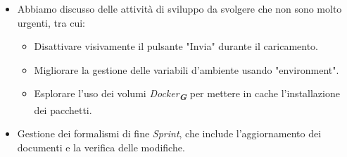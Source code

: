 \begin{itemize}
    \item Abbiamo discusso delle attività di sviluppo da svolgere che non sono molto urgenti, tra cui: 
    \begin{itemize}
        \item Disattivare visivamente il pulsante "Invia" durante il caricamento.
        \item Migliorare la gestione delle variabili d'ambiente usando "environment".
        \item Esplorare l'uso dei volumi \emph{Docker}\textsubscript{\textit{\textbf{G}}} per mettere in cache l'installazione dei pacchetti.
    \end{itemize}
    \item Gestione dei formalismi di fine \emph{Sprint}, che include l'aggiornamento dei documenti e la verifica delle modifiche.
\end{itemize}


